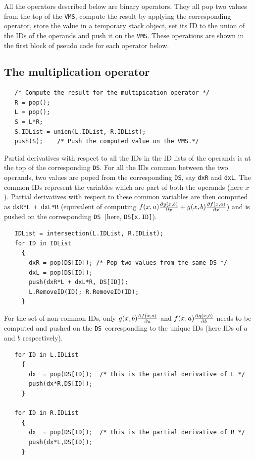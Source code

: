 \documentclass[acmtoms,acmnow]{acmtrans2m}
\newcommand{\DS}{{\tt DS}}
\newcommand{\VMS}{{\tt VMS}}
\begin{document}
All the operators described below are binary operators.  They all pop
two values from the top of the \VMS, compute the result by applying
the corresponding operator, store the value in a temporary stack
object, set its ID to the union of the IDs of the operands and push it
on the \VMS.  These operations are shown in the first block of pseudo
code for each operator below.

%
%
\subsection{The multiplication operator}
\begin{verbatim}
   /* Compute the result for the multipication operator */
   R = pop();  
   L = pop();
   S = L*R;
   S.IDList = union(L.IDList, R.IDList);
   push(S);    /* Push the computed value on the VMS.*/
\end{verbatim}
Partial derivatives with respect to all the IDs in the ID lists of the
operands is at the top of the corresponding {\tt DS}.  For all the IDs
common between the two operands, two values are poped from the
corresponding \DS, say {\tt dxR} and {\tt dxL}.  The common IDs
represent the variables which are part of both the operands (here
$x$).  Partial derivatives with respect to these common variables are
then computed as {\tt dxR*L + dxL*R} (equivalent of computing
${f(x,a)} {\partial g(x,b) \over \partial x} + {g(x,b)}{\partial
  f(x,a) \over \partial x}$) and is pushed on the corresponding \DS\ 
(here, {\tt DS[x.ID]}).
\begin{verbatim}
   IDList = intersection(L.IDList, R.IDList);
   for ID in IDList
     {
       dxR = pop(DS[ID]); /* Pop two values from the same DS */  
       dxL = pop(DS[ID]);
       push(dxR*L + dxL*R, DS[ID]);
       L.RemoveID(ID); R.RemoveID(ID);
     }
\end{verbatim}
For the set of non-common IDs, only ${g(x,b)}{\partial f(x,a) \over
\partial a}$ and ${f(x,a)} {\partial g(x,b) \over \partial b}$ needs
to be computed and pushed on the \DS\ corresponding to the unique IDs
(here IDs of $a$ and $b$ respectively).
\begin{verbatim}
   for ID in L.IDList
     {
       dx  = pop(DS[ID]);  /* this is the partial derivative of L */
       push(dx*R,DS[ID]);
     }

   for ID in R.IDList
     {
       dx  = pop(DS[ID]);  /* this is the partial derivative of R */
       push(dx*L,DS[ID]);
     }
\end{verbatim}
\end{document}
